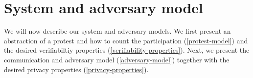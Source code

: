 \section{System and adversary model}%
\label{system-model}

We will now describe our system and adversary models.
We first present an abstraction of a protest and how to count the participation 
(\cref{protest-model}) and the desired verifiabiltiy properties 
(\cref{verifiability-properties}).
Next, we present the communication and adversary model (\cref{adversary-model}) 
together with the desired privacy properties (\cref{privacy-properties}).





